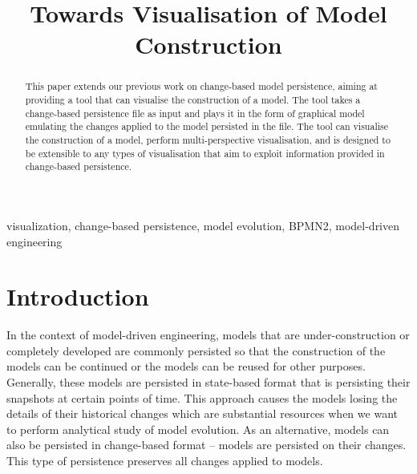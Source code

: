 \documentclass[conference]{IEEEtran}
\begin{document}
\title{Towards Visualisation of Model Construction
}

\author{
}
\maketitle

\begin{abstract}
This paper extends our previous work on change-based model persistence, aiming at
providing a tool that can visualise the construction of a model. The tool 
takes a change-based persistence file as input and plays it 
in the form of graphical model emulating the changes applied to 
the model persisted in the file. 
The tool can visualise the construction of a model, 
perform multi-perspective visualisation, and
is designed to be extensible to any types of visualisation 
that aim to exploit information provided in change-based persistence.


\end{abstract}

\begin{IEEEkeywords}
visualization, change-based persistence, model evolution, BPMN2, model-driven engineering
\end{IEEEkeywords}

\section{Introduction}
\label{sec:introduction}
In the context of model-driven engineering, models that are under-construction or completely developed are commonly persisted 
so that the construction of the models can be continued or the models can be reused for other purposes. 
Generally, these models are persisted in state-based format that is persisting their snapshots at certain points of time. 
This approach causes the models losing the details of their historical changes which are substantial resources when 
we want to perform analytical study of model evolution. As an alternative, models can also be persisted in change-based format -- models are 
persisted on their changes. This type of persistence preserves all changes applied to models.
\end{document}
